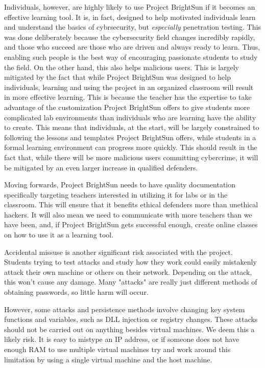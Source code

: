 \documentclass[openright]{report}
\begin{document}
\par Individuals, however, are highly likely to use Project BrightSun if it becomes an effective learning tool. It is, in fact, designed to help motivated individuals learn and understand the basics of cybrsecurity, but \textit{especially} penetration testing. This was done deliberately because the cybersecurity field changes incredibly rapidly, and those who succeed are those who are driven and always ready to learn. Thus, enabling such people is the best way of encouraging passionate students to study the field.  On the other hand, this also helps malicious users. This is largely mitigated by the fact that while Project BrightSun was designed to help individuals, learning and using the project in an organized classroom will result in more effective learning. This is because the teacher has the expertise to take advantage of the customization Project BrightSun offers to give students more complicated lab environments than individuals who are learning have the ability to create. This means that individuals, at the start, will be largely constrained to following the lessons and templates Project BrightSun offers, while students in a formal learning environment can progress more quickly. This should result in the fact that, while there will be more malicious users committing cybercrime, it will be mitigated by an even larger increase in qualified defenders. 

\par Moving forwards, Project BrightSun needs to have quality documentation specifically targeting teachers interested in utilizing it for labs or in the classroom. This will ensure that it benefits ethical defenders more than unethical hackers. It will also mean we need to communicate with more teachers than we have been, and, if Project BrightSun gets successful enough, create online classes on how to use it as a learning tool.

\par Accidental missuse is another significant risk associated with the project. Students trying to test attacks and study how they work could easily mistakenly attack their own machine or others on their network. Depending on the attack, this won't cause any damage. Many "attacks" are really just different methods of obtaining passwords, so little harm will occur.

\par However, some attacks and persistence methods involve changing key system functions and variables, such as DLL injection or registry changes. These attacks should not be carried out on anything besides virtual machines. We deem this a likely risk. It is easy to mistype an IP address, or if someone does not have enough RAM to use multiple virtual machines try and work around this limitation by using a single virtual machine and the host machine.
\end{document}

